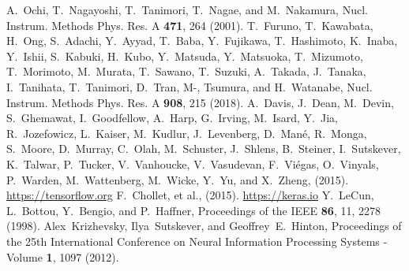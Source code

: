 \documentclass{jps-cp}
\begin{document}
\begin{thebibliography}{9}
  A.~Ochi, T.~Nagayoshi, T.~Tanimori, T.~Nagae, and M.~Nakamura,
  Nucl. Instrum. Methods Phys. Res. A \textbf{471}, 264 (2001).
  T.~Furuno, T.~Kawabata, H.~Ong, S.~Adachi, Y.~Ayyad, T.~Baba, Y.~Fujikawa, T.~Hashimoto, K.~Inaba, Y.~Ishii,
  S.~Kabuki, H.~Kubo, Y.~Matsuda, Y.~Matsuoka, T.~Mizumoto, T.~Morimoto, M.~Murata, T.~Sawano, T.~Suzuki, A.~Takada,
  J.~Tanaka, I.~Tanihata, T.~Tanimori, D.~Tran, M-, Tsumura, and H.~Watanabe,
  Nucl. Instrum. Methods Phys. Res. A \textbf{908}, 215 (2018).
  A.~Davis, J.~Dean, M.~Devin, S.~Ghemawat, I.~Goodfellow, A.~Harp, G.~Irving,
  M.~Isard, Y.~Jia, R.~Jozefowicz, L.~Kaiser, M.~Kudlur, J.~Levenberg,
  D.~Man\'{e}, R.~Monga, S.~Moore, D.~Murray, C.~Olah, M.~Schuster, J.~Shlens,
  B.~Steiner, I.~Sutskever, K.~Talwar, P.~Tucker, V.~Vanhoucke, V.~Vasudevan,
  F.~Vi\'{e}gas, O.~Vinyals, P.~Warden, M.~Wattenberg, M.~Wicke, Y.~Yu, and
  X.~Zheng, (2015).
  \url{https://tensorflow.org}
  F.~Chollet, et al., (2015). \url{https://keras.io}
  Y.~LeCun, L.~Bottou, Y.~Bengio, and P.~Haffner,
  Proceedings of the IEEE \textbf{86}, 11, 2278 (1998).
  Alex~Krizhevsky, Ilya~Sutskever, and Geoffrey~E.~Hinton,
  Proceedings of the 25th International Conference on Neural Information Processing Systems - Volume \textbf{1}, 1097 (2012).
%
  
\end{thebibliography}
\end{document}
